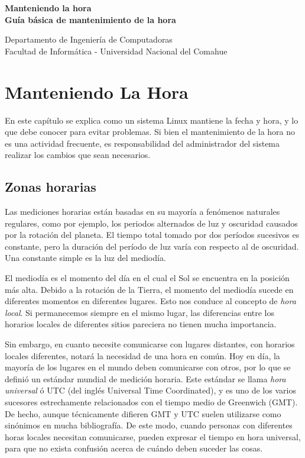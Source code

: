 \documentclass[12pt]{article}
\def\maketitle{

 \makeatletter
 {\color{bl} \centering \huge \sc \textbf{
 Manteniendo la hora \\ 
\large \vspace*{-8pt} \color{black} Guía básica de mantenimiento de la hora
 \vspace*{8pt} }\par}
 \makeatother


 \makeatletter
 {\centering \small 
 	Departamento de Ingeniería de Computadoras \\
 	Facultad de Informática - Universidad Nacional del Comahue \\
 	\vspace{20pt} }
 \makeatother

}
\begin{document}
\thispagestyle{empty}
\maketitle
\setlength{\parindent}{0pt}

\section*{Manteniendo La Hora}

En este capítulo se explica como un sistema Linux mantiene la fecha y hora,
y lo que debe conocer para evitar problemas. Si bien el mantenimiento de
la hora no es una actividad frecuente, es responsabilidad del administrador 
del sistema realizar los cambios que sean necesarios. 


\subsection*{Zonas horarias}

Las mediciones horarias están basadas en su mayoría a fenómenos naturales regulares,
como por ejemplo, los periodos alternados de luz y oscuridad
causados por la rotación del planeta. El tiempo total tomado por dos períodos
sucesivos es constante, pero la duración del período de luz varía
con respecto al de oscuridad. Una constante simple es la luz del mediodía.

El mediodía es el momento del día en el cual el Sol se encuentra en la posición más alta. 
Debido a la rotación de la Tierra, el momento del mediodía sucede en diferentes 
momentos en diferentes lugares. Esto nos conduce al concepto de \textit{hora local}.
Si permanecemos siempre en el mismo lugar, las diferencias entre los
horarios locales de diferentes sitios pareciera no tienen mucha importancia.

Sin embargo, en cuanto necesite comunicarse con lugares distantes, con horarios locales 
diferentes, notará la necesidad de una hora en común. Hoy en día, la mayoría de los lugares en el mundo deben
comunicarse con otros, por lo que se definió un estándar mundial de medición
horaria. Este estándar se llama \textit{hora universal} ó UTC (del inglés Universal 
Time Coordinated), y es uno de los varios sucesores estrechamente 
relacionados con el tiempo medio de Greenwich (GMT). De hecho, aunque técnicamente 
difieren GMT y UTC suelen utilizarse como sinónimos en mucha bibliografía.   
De este modo, cuando personas con diferentes horas locales
necesitan comunicarse, pueden expresar el tiempo en hora universal,
para que no exista confusión acerca de cuándo deben suceder las cosas.
\end{document}
